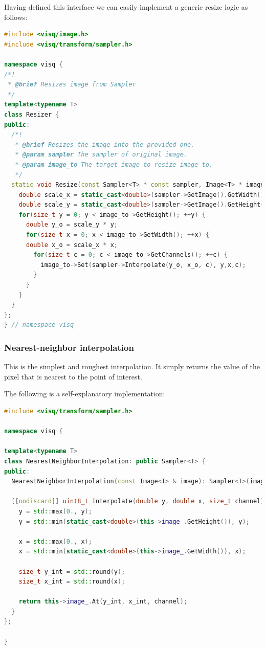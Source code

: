 \documentclass[11pt]{book}
\begin{document}
Having defined this interface we can easily implement a generic resize logic as follows:

\begin{lstlisting}[language=C++, caption={The implementation of resizer using sampler}]
#include <visq/image.h>
#include <visq/transform/sampler.h>

namespace visq {
/*!
 * @brief Resizes image from Sampler
 */
template<typename T>
class Resizer {
public:
  /*!
   * @brief Resizes the image into the provided one.
   * @param sampler The sampler of original image.
   * @param image_to The target image to resize image to.
   */
  static void Resize(const Sampler<T> * const sampler, Image<T> * image_to) {
    double scale_x = static_cast<double>(sampler->GetImage().GetWidth()) /  image_to->GetWidth();
    double scale_y = static_cast<double>(sampler->GetImage().GetHeight()) /  image_to->GetHeight();
    for(size_t y = 0; y < image_to->GetHeight(); ++y) {
      double y_o = scale_y * y;
      for(size_t x = 0; x < image_to->GetWidth(); ++x) {
      double x_o = scale_x * x;
        for(size_t c = 0; c < image_to->GetChannels(); ++c) {
          image_to->Set(sampler->Interpolate(y_o, x_o, c), y,x,c);
        }
      }
    }
  }
};
} // namespace visq
\end{lstlisting}

\subsubsection{Nearest-neighbor interpolation}

This is the simplest and roughest interpolation. It simply returns the value of the pixel that is nearest to the point of interest. 

The following is a self-explanatory implementation:

\begin{lstlisting}[language=C++, caption={An implementation of the Nearest Neighbor interpolation}]
#include <visq/transform/sampler.h>

namespace visq {

template<typename T>
class NearestNeighborInterpolation: public Sampler<T> {
public:
  NearestNeighborInterpolation(const Image<T> & image): Sampler<T>(image) {}

  [[nodiscard]] uint8_t Interpolate(double y, double x, size_t channel) const override {
    y = std::max(0., y);
    y = std::min(static_cast<double>(this->image_.GetHeight()), y);

    x = std::max(0., x);
    x = std::min(static_cast<double>(this->image_.GetWidth()), x);

    size_t y_int = std::round(y);
    size_t x_int = std::round(x);

    return this->image_.At(y_int, x_int, channel);
  }
};

}
\end{lstlisting}
\end{document}
